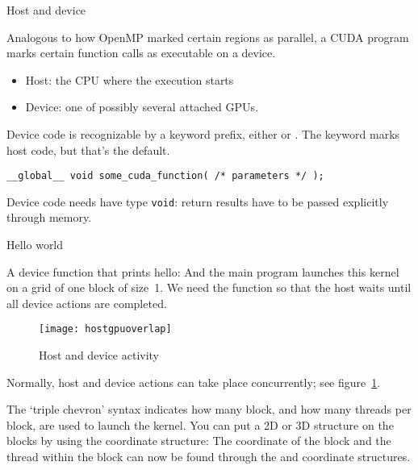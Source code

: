 
 {Host and device}

Analogous to how OpenMP marked certain regions as parallel,
a \ac{CUDA} program marks certain function calls as
executable on a device.
\begin{itemize}
\item Host: the CPU where the execution starts
\item Device: one of possibly several attached \acp{GPU}.
\end{itemize}
Device code is recognizable by a keyword prefix,
either  or .
The  keyword marks host code, but that's the default.

\begin{lstlisting}
__global__ void some_cuda_function( /* parameters */ );
\end{lstlisting}
Device code needs have type \lstinline{void}:
return results have to be passed explicitly through memory.

 {Hello world}

A device function that prints hello:
And the main program launches this kernel on a grid of one block of size~1.
We need the  function so that the host waits
until all device actions are completed.
\begin{figure}[ht]
  \texttt{[image: hostgpuoverlap]}
  \caption{Host and device activity}
  \label{fig:hostgpuoverlap}
\end{figure}
Normally, host and device actions can take place concurrently;
see figure~\ref{fig:hostgpuoverlap}.

The `triple chevron' syntax indicates how many block, and how many threads per block,
are used to launch the kernel.
You can put a 2D or 3D structure on the blocks by using the 
coordinate structure:
The coordinate of the block and the thread within the block can now be
found through the  and 
coordinate structures.

